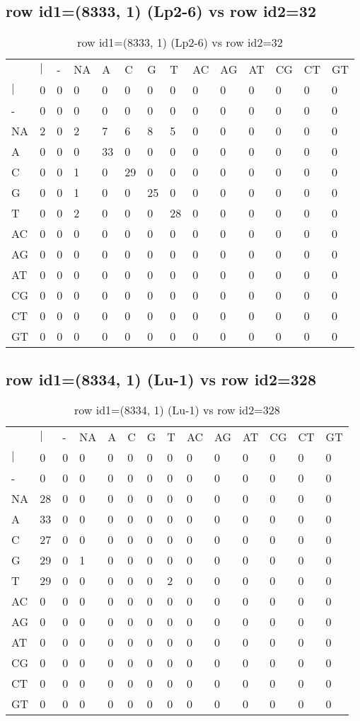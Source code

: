 \subsection{row id1=(8333, 1) (Lp2-6) vs row id2=32}
\begin{center}
\begin{longtable}{|l|l|l|l|l|l|l|l|l|l|l|l|l|l|}
\caption{row id1=(8333, 1) (Lp2-6) vs row id2=32} \label{table_dm532}\\
\hline
\\
\hline
&$|$&-&NA&A&C&G&T&AC&AG&AT&CG&CT&GT\\
$|$&0&0&0&0&0&0&0&0&0&0&0&0&0\\
-&0&0&0&0&0&0&0&0&0&0&0&0&0\\
NA&2&0&2&7&6&8&5&0&0&0&0&0&0\\
A&0&0&0&33&0&0&0&0&0&0&0&0&0\\
C&0&0&1&0&29&0&0&0&0&0&0&0&0\\
G&0&0&1&0&0&25&0&0&0&0&0&0&0\\
T&0&0&2&0&0&0&28&0&0&0&0&0&0\\
AC&0&0&0&0&0&0&0&0&0&0&0&0&0\\
AG&0&0&0&0&0&0&0&0&0&0&0&0&0\\
AT&0&0&0&0&0&0&0&0&0&0&0&0&0\\
CG&0&0&0&0&0&0&0&0&0&0&0&0&0\\
CT&0&0&0&0&0&0&0&0&0&0&0&0&0\\
GT&0&0&0&0&0&0&0&0&0&0&0&0&0\\
\hline
\end{longtable}
\end{center}

\subsection{row id1=(8334, 1) (Lu-1) vs row id2=328}
\begin{center}
\begin{longtable}{|l|l|l|l|l|l|l|l|l|l|l|l|l|l|}
\caption{row id1=(8334, 1) (Lu-1) vs row id2=328} \label{table_dm534}\\
\hline
\\
\hline
&$|$&-&NA&A&C&G&T&AC&AG&AT&CG&CT&GT\\
$|$&0&0&0&0&0&0&0&0&0&0&0&0&0\\
-&0&0&0&0&0&0&0&0&0&0&0&0&0\\
NA&28&0&0&0&0&0&0&0&0&0&0&0&0\\
A&33&0&0&0&0&0&0&0&0&0&0&0&0\\
C&27&0&0&0&0&0&0&0&0&0&0&0&0\\
G&29&0&1&0&0&0&0&0&0&0&0&0&0\\
T&29&0&0&0&0&0&2&0&0&0&0&0&0\\
AC&0&0&0&0&0&0&0&0&0&0&0&0&0\\
AG&0&0&0&0&0&0&0&0&0&0&0&0&0\\
AT&0&0&0&0&0&0&0&0&0&0&0&0&0\\
CG&0&0&0&0&0&0&0&0&0&0&0&0&0\\
CT&0&0&0&0&0&0&0&0&0&0&0&0&0\\
GT&0&0&0&0&0&0&0&0&0&0&0&0&0\\
\hline
\end{longtable}
\end{center}

